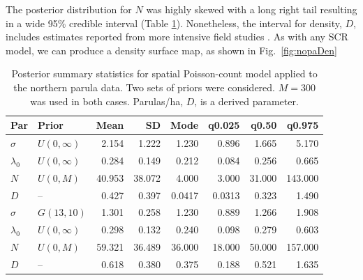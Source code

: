 The posterior distribution for
$N$ was highly skewed with a long right tail resulting in a wide 95\%
credible interval (Table \ref{t:nopaPosts}). Nonetheless, the interval
for density, $D$, includes estimates reported from more intensive field
studies \citep{moldenhaer_regelski:1996}. As with any SCR model,
we can produce a density surface map, as shown in Fig.~\ref{fig:nopaDen}


\begin{table}%
  \caption{Posterior summary statistics for spatial Poisson-count
    model applied to the northern parula data. Two sets of priors were
    considered. $M=300$ was used in both cases. Parulas/ha, $D$, is a
    derived parameter.}
  \scriptsize
  \begin{tabular}{l l rrrrrr}
    \hline
    Par        & Prior                  & Mean  & SD    & Mode   & q0.025  & q0.50  & q0.975  \\
    \hline
    $\sigma$   & $U(0, \infty)$   & 2.154   & 1.222  & 1.230   & 0.896   & 1.665   & 5.170    \\
    $\lambda_0$ & $U(0, \infty)$  & 0.284   & 0.149 & 0.212    & 0.084  & 0.256  & 0.665   \\
    $N$        & $U(0, M)$             & 40.953   & 38.072  & 4.000  & 3.000       & 31.000     & 143.000     \\
    $D$        &  --                   & 0.427    & 0.397 & 0.0417   & 0.0313  & 0.323  & 1.490    \\
    \hline
    $\sigma$    & $G(13, 10)$          & 1.301    & 0.258 & 1.230    & 0.889   & 1.266   & 1.908    \\
    $\lambda_0$ & $U(0, \infty)$ & 0.298    & 0.132 & 0.240    & 0.098   & 0.279  & 0.603   \\
    $N$         & $U(0, M)$            & 59.321   & 36.489  & 36.000 & 18.000      & 50.000     & 157.000     \\
    $D$         &  --                  & 0.618    & 0.380 & 0.375   & 0.188   & 0.521  & 1.635    \\
    \hline
  \end{tabular}
  \label{t:nopaPosts}
\vspace{0.5cm}
\end{table}



